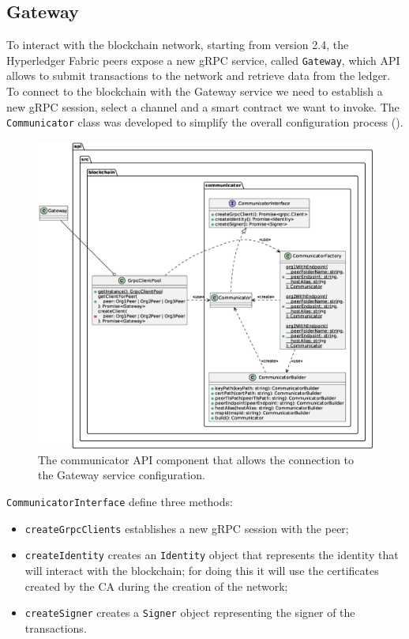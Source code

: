 \documentclass{scrartcl}
\begin{document}
\subsection{Gateway}
To interact with the blockchain network, starting from version 2.4, the Hyperledger Fabric peers expose a new gRPC service, called \texttt{Gateway}, which API allows to submit transactions to the network and retrieve data from the ledger.
% 
To connect to the blockchain with the Gateway service we need to establish a new gRPC session, select a channel and a smart contract we want to invoke. The \texttt{Communicator} class was developed to simplify the overall configuration process ().

\begin{figure}
    \centering
    \includegraphics[width=\linewidth]{figures/communicator-api.eps}
    \caption{The communicator API component that allows the connection to the Gateway service configuration.}
    \label{fig:communicator-api} 
\end{figure}

\texttt{CommunicatorInterface} define three methods:
\begin{itemize}
    \item \texttt{createGrpcClients} establishes a new gRPC session with the peer;
    \item \texttt{createIdentity} creates an \texttt{Identity} object that represents the identity that will interact with the blockchain; for doing this it will use the certificates created by the CA during the creation of the network;
    \item \texttt{createSigner} creates a \texttt{Signer} object representing the signer of the transactions.
\end{itemize} 
\end{document}
